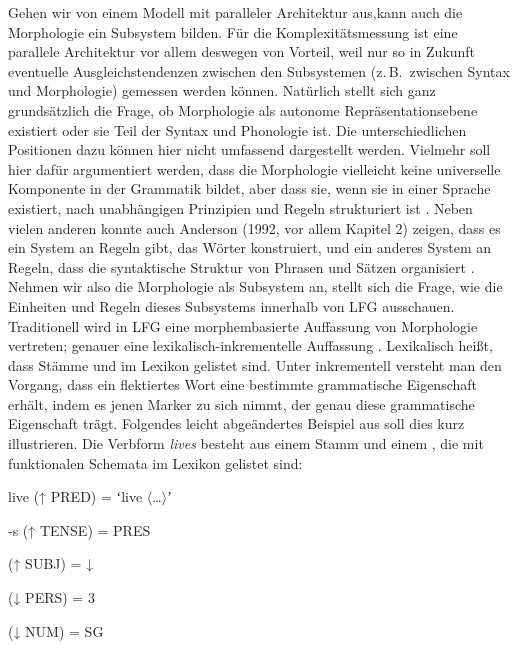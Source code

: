 Gehen wir von einem Modell mit paralleler Architektur aus,\largerpage kann auch die Morphologie ein Subsystem bilden. Für die Komplexitätsmessung ist eine parallele Architektur vor allem deswegen von Vorteil, weil nur so in Zukunft eventuelle Ausgleichstendenzen zwischen den Subsystemen (z.\,B.\ zwischen Syntax und Morphologie) gemessen werden können. Natürlich stellt sich ganz grundsätzlich die Frage, ob Morphologie als autonome Repräsentationsebene existiert oder sie Teil der Syntax und Phonologie ist. Die unterschiedlichen Positionen dazu können hier nicht umfassend dargestellt werden. Vielmehr soll hier dafür argumentiert werden, dass die Morphologie vielleicht keine universelle Komponente in der Grammatik bildet, aber dass sie, wenn sie in einer Sprache existiert, nach unabhängigen Prinzipien und Regeln strukturiert ist \citep[156]{BörjarsVincentChapman1997}. Neben vielen anderen konnte auch Anderson (1992, vor allem Kapitel 2) zeigen, dass es ein System an Regeln gibt, das Wörter konstruiert, und ein anderes System an Regeln, dass die syntaktische Struktur von Phrasen und Sätzen organisiert \citep[22]{Anderson1992}. Nehmen wir also die Morphologie als Subsystem an, stellt sich die Frage, wie die Einheiten und Regeln dieses Subsystems innerhalb von LFG ausschauen. Traditionell wird in LFG eine morphembasierte Auffassung von Morphologie vertreten; genauer eine le\-xi\-ka\-lisch-in\-kre\-men\-tel\-le Auffassung \citep[112]{AckermanStump2004}. Lexikalisch heißt, dass Stämme und  im Lexikon gelistet sind. Unter inkrementell versteht man den Vorgang, dass ein flektiertes Wort eine bestimmte grammatische Eigenschaft erhält, indem es jenen Marker zu sich nimmt, der genau diese grammatische Eigenschaft trägt. Folgendes leicht abgeändertes Beispiel aus \citet[55]{Bresnan2001} soll dies kurz illustrieren. Die Verbform \textit{lives} besteht aus einem Stamm und einem , die mit funktionalen Schemata im Lexikon gelistet sind:\\\pagebreak

\noindent
\begin{styleNoSpacing}
live  (↑ PRED) = ʻlive $\langle$…$\rangle$ʼ
\end{styleNoSpacing}

\noindent
\begin{styleNoSpacing}
-s  (↑ TENSE) = PRES
\end{styleNoSpacing}
\noindent
\begin{styleNoSpacing}
  (↑ SUBJ) = ↓
\end{styleNoSpacing}
\noindent
\begin{styleNoSpacing}
    (↓ PERS) = 3
\end{styleNoSpacing}
\noindent
\begin{styleNoSpacing}
    (↓ NUM) = SG
\end{styleNoSpacing} \\

